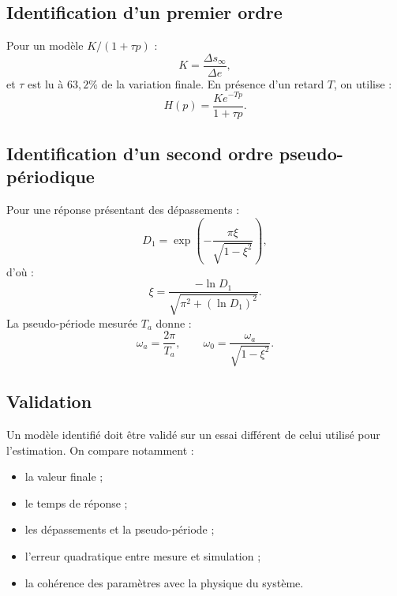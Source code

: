 \subsection{Identification d'un premier ordre}

Pour un modèle $K/(1+\tau p)$ :
\[
K=\frac{\Delta s_\infty}{\Delta e},
\]
et $\tau$ est lu à $63{,}2\%$ de la variation finale. En présence d'un retard $T$, on utilise :
\[
H(p)=\frac{K e^{-Tp}}{1+\tau p}.
\]

\subsection{Identification d'un second ordre pseudo-périodique}

Pour une réponse présentant des dépassements :
\[
D_1=\exp\left(-\frac{\pi\xi}{\sqrt{1-\xi^2}}\right),
\]
d'où :
\[
\xi=\frac{-\ln D_1}{\sqrt{\pi^2+(\ln D_1)^2}}.
\]
La pseudo-période mesurée $T_a$ donne :
\[
\omega_a=\frac{2\pi}{T_a},\qquad
\omega_0=\frac{\omega_a}{\sqrt{1-\xi^2}}.
\]

\subsection{Validation}

Un modèle identifié doit être validé sur un essai différent de celui utilisé pour l'estimation. On compare notamment :
\begin{itemize}
  \item la valeur finale ;
  \item le temps de réponse ;
  \item les dépassements et la pseudo-période ;
  \item l'erreur quadratique entre mesure et simulation ;
  \item la cohérence des paramètres avec la physique du système.
\end{itemize}
